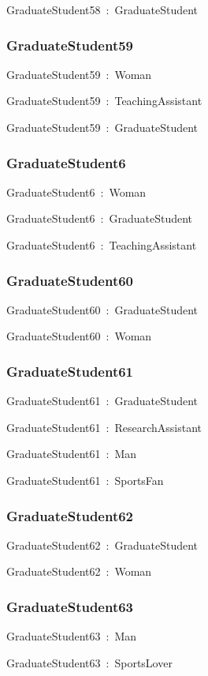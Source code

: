\documentclass{article}
\begin{document}
GraduateStudent58~:~GraduateStudent

\subsubsection*{GraduateStudent59}

GraduateStudent59~:~Woman

GraduateStudent59~:~TeachingAssistant

GraduateStudent59~:~GraduateStudent

\subsubsection*{GraduateStudent6}

GraduateStudent6~:~Woman

GraduateStudent6~:~GraduateStudent

GraduateStudent6~:~TeachingAssistant

\subsubsection*{GraduateStudent60}

GraduateStudent60~:~GraduateStudent

GraduateStudent60~:~Woman

\subsubsection*{GraduateStudent61}

GraduateStudent61~:~GraduateStudent

GraduateStudent61~:~ResearchAssistant

GraduateStudent61~:~Man

GraduateStudent61~:~SportsFan

\subsubsection*{GraduateStudent62}

GraduateStudent62~:~GraduateStudent

GraduateStudent62~:~Woman

\subsubsection*{GraduateStudent63}

GraduateStudent63~:~Man

GraduateStudent63~:~SportsLover
\end{document}
